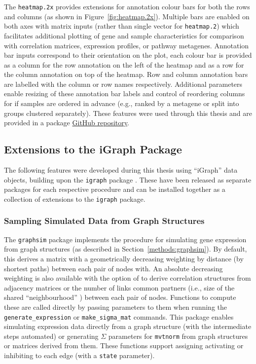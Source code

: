 The \texttt{heatmap.2x} provides extensions for annotation colour bars for both the rows and columns (as shown in Figure~\ref{fig:heatmap.2x}). Multiple bars are enabled on both axes with matrix inputs (rather than single vector for \texttt{heatmap.2}) which facilitates additional plotting of gene and sample characteristics for comparison with correlation matrices, expression profiles, or pathway metagenes. Annotation bar inputs correspond to their orientation on the plot, each colour bar is provided as a column for the row annotation on the left of the heatmap and as a row for the column annotation on top of the heatmap. Row and column annotation bars are labelled with the column or row names respectively. Additional parameters enable resizing of these annotation bar labels and control of reordering columns for if samples are ordered in advance (e.g., ranked by a metagene or split into groups clustered separately).  These features were used through this thesis and are provided in a package \href{https://github.com/TomKellyGenetics/heatmap.2x}{GitHub repository}.


\FloatBarrier

\subsection{Extensions to the iGraph Package} \label{methods:igraph_extensions}
The following features were developed during this thesis using ``iGraph'' data objects, building upon the \texttt{igraph} package \citep{igraph}. These have been released as separate packages for each respective procedure and can be installed together as a collection of extensions to the \texttt{igraph} package.

\subsubsection{Sampling Simulated Data from Graph Structures}
The \texttt{graphsim} package implements the procedure for simulating gene expression from graph structures (as described in Section~\ref{methods:graphsim}). By default, this derives a matrix with a geometrically decreasing weighting by distance (by shortest paths) between each pair of nodes with. An absolute decreasing weighting is also available with the option of to derive correlation structures from adjacency matrices or the number of links common partners (i.e., size of the shared ``neighbourhood'' \citep{Hell1976}) between each pair of nodes. Functions to compute these are called directly by passing parameters to them when running the \texttt{generate\_expression} or \texttt{make\_sigma\_mat} commands. This package enables simulating expression data directly from a graph structure (with the intermediate steps automated) or generating $\Sigma$ parameters for \texttt{mvtnorm} from graph structures or matrices derived from them. These functions support assigning activating or inhibiting to each edge (with a \texttt{state} parameter).

